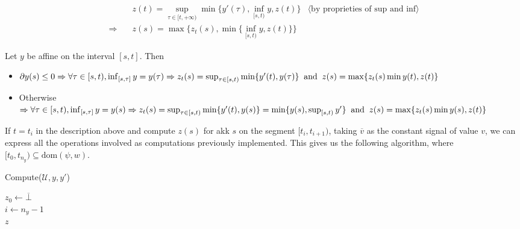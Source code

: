 \documentclass{suftesi}
\newcommand{\dom}[1]{\mathrm{dom}(#1 ,w)}
\begin{document}
\begin{align*}
                &\quad z(t)= \sup_{\tau\in[t,+\infty)}\min\biggl\{y'(\tau),\inf_{[s,t)}y,z(t)\biggr\} & \langle\text{by proprieties of sup and inf} \rangle \\
    \Rightarrow &\quad z(s)= \max\biggl\{z_t(s),\min\biggl\{\inf_{[s,t)}y,z(t)\biggr\}\biggr\}
\end{align*}

Let $y$ be affine on the interval $[s,t]$. Then
\begin{itemize}[leftmargin=0.5cm]
    \item $\partial y(s)\leq 0 \Rightarrow \forall \tau \in [s,t), \inf_{[s,\tau]}y=y(\tau)\Rightarrow \\z_t(s)=\sup_{\tau\in[s,t)}\min\{y'(t),y(\tau)\}\: \text{ and } \:z(s)=\max\{z_t(s)\min{y(t),z(t)}\}$
    \item Otherwise $\Rightarrow \forall \tau\in [s,t), \inf_{[s,\tau]}y=y(s)\Rightarrow \\z_t(s)=\sup_{\tau\in[s,t)}\min\{y'(t),y(s)\}=\min\{y(s), \sup_{[s,t)}y'\} \: \text{ and } \\\:z(s)=\max\{z_t(s)\min{y(s),z(t)}\}$
\end{itemize}

If $t=t_i$ in the description above and compute $z(s)$ for akk $s$ on the segment $[t_i,t_{i+1})$, taking $\overline{v}$ as the constant signal of value $v$, we can express all the operations involved as computations previously implemented. This gives us the following algorithm, where $[t_0,t_{n_y})\subseteq \dom{\psi}$.

\begin{algorithm}[H]
    \caption{Compute($\mathcal{U}, y, y'$)}
    $z_0 \gets \overline{\bot}$\\
    $i \gets n_y - 1$\\
    \While{$i \geq 0$}{
        \If{$\partial y(t_i)$}{
            $z_1 \gets \text{Compute}(\text{pos}, y'_{\upharpoonright [t_i, t_{i+1})})$\\
            $z_2 \gets \text{Compute}(\land, z_1, y_{\upharpoonright [t_i, t_{i+1})})$\\
            $z_3 \gets \text{Compute}(\land, \overline{y(t_{i+1})}, z_0)$\\
            $z_{\upharpoonright [t_i, t_{i+1})} \gets \text{Compute}(\lor, z_2, z_3)$\\
        }
        \Else{
            $z_1 \gets \text{Compute}(\land, y'_{\upharpoonright [t_i, t_{i+1})}, y_{\upharpoonright [t_i, t_{i+1})})$\\
            $z_2 \gets \text{Compute}(\text{pos}, z_1)$\\
            $z_3 \gets \text{Compute}(\land, y_{\upharpoonright [t_i, t_{i+1})}, z_0)$\\
            $z_{\upharpoonright [t_i, t_{i+1})} \gets \text{Compute}(\lor, z_2, z_3)$
        }
        
        $z_0 \gets \overline{z_{\upharpoonright [t_i, t_{i+1})}(t_i)}$\\
        $i \gets i - 1$
    }
    \Return $z$
\end{algorithm}




\printbibliography
\end{document}
